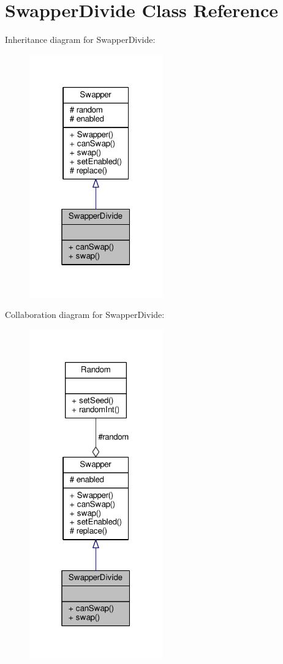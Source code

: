 \hypertarget{classSwapperDivide}{}\section{Swapper\+Divide Class Reference}
\label{classSwapperDivide}


Inheritance diagram for Swapper\+Divide\+:
\nopagebreak
\begin{figure}[H]
\begin{center}
\leavevmode
\includegraphics[width=163pt]{classSwapperDivide__inherit__graph}
\end{center}
\end{figure}


Collaboration diagram for Swapper\+Divide\+:
\nopagebreak
\begin{figure}[H]
\begin{center}
\leavevmode
\includegraphics[width=163pt]{classSwapperDivide__coll__graph}
\end{center}
\end{figure}
